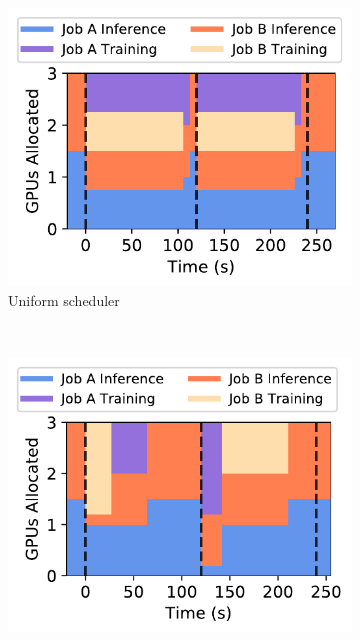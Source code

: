 \begin{figure}[t]
  \centering
    \begin{subfigure}[t]{0.47\columnwidth}
    \centering
    \includegraphics[width=\linewidth]{ekya/figures/motivation/Scheduler/schedmot_res_eventual_best_cfgs.pdf}
    \caption{\small Uniform scheduler}
    \label{fig:schedmot-res-naive}
  \end{subfigure}  
  ~~
  \begin{subfigure}[t]{0.47\columnwidth}
    \centering
    \includegraphics[width=\linewidth]{ekya/figures/motivation/Scheduler/schedmot_res_prioritization_and_optimal_cfgs.pdf}

\end{subfigure}
\end{figure}
